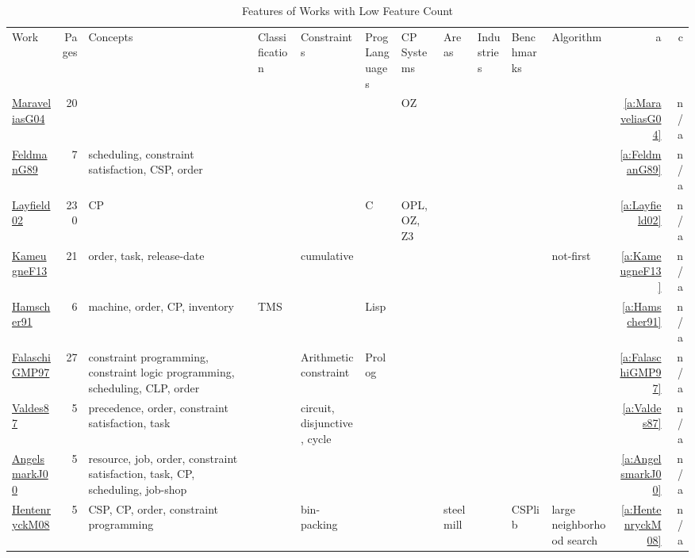 {\scriptsize
\begin{longtable}{>{\raggedright\arraybackslash}p{3cm}r>{\raggedright\arraybackslash}p{4cm}p{1.5cm}p{2cm}p{1.5cm}p{1.5cm}p{1.5cm}p{1.5cm}p{2cm}p{1.5cm}rr}
\rowcolor{white}\caption{Features of Works with Low Feature Count}\\ \toprule
\rowcolor{white}Work & Pages & Concepts & Classification & Constraints & \shortstack{Prog\\Languages} & \shortstack{CP\\Systems} & Areas & Industries & Benchmarks & Algorithm & a & c\\ \midrule\endhead
\bottomrule
\endfoot
\href{../works/MaraveliasG04.pdf}{MaraveliasG04}~\cite{MaraveliasG04} & 20 &  &  &  &  & OZ &  &  &  &  & \ref{a:MaraveliasG04} & n/a\\
\href{../works/FeldmanG89.pdf}{FeldmanG89}~\cite{FeldmanG89} & 7 & scheduling, constraint satisfaction, CSP, order &  &  &  &  &  &  &  &  & \ref{a:FeldmanG89} & n/a\\
\href{../works/Layfield02.pdf}{Layfield02}~\cite{Layfield02} & 230 & CP &  &  & C  & OPL, OZ, Z3 &  &  &  &  & \ref{a:Layfield02} & n/a\\
\href{../works/KameugneF13.pdf}{KameugneF13}~\cite{KameugneF13} & 21 & order, task, release-date &  & cumulative &  &  &  &  &  & not-first & \ref{a:KameugneF13} & n/a\\
\href{../works/Hamscher91.pdf}{Hamscher91}~\cite{Hamscher91} & 6 & machine, order, CP, inventory & TMS &  & Lisp &  &  &  &  &  & \ref{a:Hamscher91} & n/a\\
\href{../works/FalaschiGMP97.pdf}{FalaschiGMP97}~\cite{FalaschiGMP97} & 27 & constraint programming, constraint logic programming, scheduling, CLP, order &  & Arithmetic constraint & Prolog &  &  &  &  &  & \ref{a:FalaschiGMP97} & n/a\\
\href{../works/Valdes87.pdf}{Valdes87}~\cite{Valdes87} & 5 & precedence, order, constraint satisfaction, task &  & circuit, disjunctive, cycle &  &  &  &  &  &  & \ref{a:Valdes87} & n/a\\
\href{../works/AngelsmarkJ00.pdf}{AngelsmarkJ00}~\cite{AngelsmarkJ00} & 5 & resource, job, order, constraint satisfaction, task, CP, scheduling, job-shop &  &  &  &  &  &  &  &  & \ref{a:AngelsmarkJ00} & n/a\\
\href{../works/HentenryckM08.pdf}{HentenryckM08}~\cite{HentenryckM08} & 5 & CSP, CP, order, constraint programming &  & bin-packing &  &  & steel mill &  & CSPlib & large neighborhood search & \ref{a:HentenryckM08} & n/a\\

\end{longtable}}

